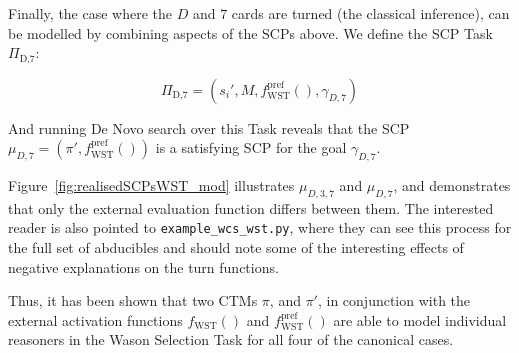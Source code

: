 Finally, the case where the $D$ and $7$ cards are turned (the classical inference), can be modelled by combining aspects of the SCPs above. We define the SCP Task $\Pi_\text{D,7}$:


\[
\Pi_\text{D,7} = (s_i', M, f_\text{WST}^\text{pref}(), \gamma_{D,7})
\]

And running De Novo search over this Task reveals that the SCP $\mu_{D,7}=(\pi', f_\text{WST}^\text{pref}())$ is a satisfying SCP for the goal $\gamma_{D,7}$. %



Figure~\ref{fig:realisedSCPsWST_mod} illustrates $\mu_{D,3,7}$ and $\mu_{D,7}$, and demonstrates that only the external evaluation function differs between them. The interested reader is also pointed to \texttt{example\_wcs\_wst.py}, where they can see this process for the full set of abducibles and should note some of the interesting effects of negative explanations on the turn functions.

Thus, it has been shown that two CTMs $\pi$, and $\pi'$, in conjunction with the external activation functions $f_\text{WST}()$ and $f_\text{WST}^\text{pref}()$ are able to model individual reasoners in the Wason Selection Task for all four of the canonical cases.













